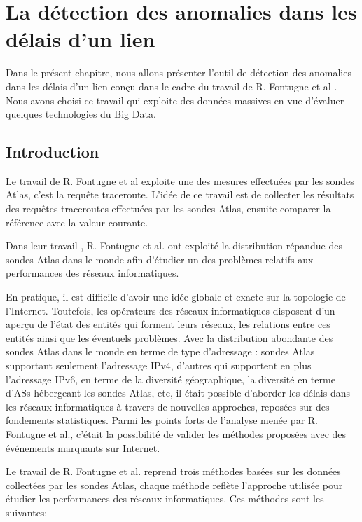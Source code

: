 
\chapter{La détection des anomalies dans les délais d'un lien}



Dans le présent chapitre, nous allons présenter l'outil de détection des anomalies dans les délais d'un lien  conçu dans le cadre du travail de R. Fontugne et al \cite{DBLP:journals/corr/FontugneAPB16}. Nous avons choisi ce travail qui exploite des données massives en vue d'évaluer quelques technologies du Big Data.

\section{Introduction}
Le travail de R. Fontugne \cite{DBLP:journals/corr/FontugneAPB16} et al exploite une des mesures effectuées par les sondes Atlas, c'est la requête traceroute. L'idée de ce travail est de collecter les résultats des requêtes traceroutes effectuées par les sondes Atlas, ensuite comparer la référence avec la valeur courante. 



Dans leur travail \cite{DBLP:journals/corr/FontugneAPB16},  R. Fontugne et al. ont exploité la  distribution répandue des sondes Atlas dans le monde afin d'étudier un des problèmes relatifs aux performances des réseaux informatiques. 

En pratique, il est  difficile  d'avoir une idée globale et exacte sur la topologie de l'Internet. Toutefois, les opérateurs des réseaux informatiques  disposent d'un aperçu de l'état des entités qui forment leurs réseaux, les relations entre ces entités ainsi que les éventuels problèmes. Avec la distribution abondante des sondes Atlas dans le monde en terme de type d'adressage : sondes Atlas supportant seulement l'adressage IPv4, d'autres qui supportent en plus l'adressage IPv6, en terme de  la diversité géographique, la diversité en terme d'ASs hébergeant les sondes Atlas, etc, il était  possible d'aborder  les délais dans les réseaux informatiques à travers de nouvelles approches, reposées sur des fondements statistiques. Parmi les points forts de l'analyse menée par R. Fontugne et al., c'était la possibilité de valider les   méthodes proposées avec des événements  marquants sur Internet.

Le travail de R. Fontugne et al. reprend trois méthodes basées sur les données collectées par les sondes Atlas, chaque méthode reflète l'approche utilisée pour étudier les performances des réseaux informatiques. Ces méthodes sont les suivantes:

